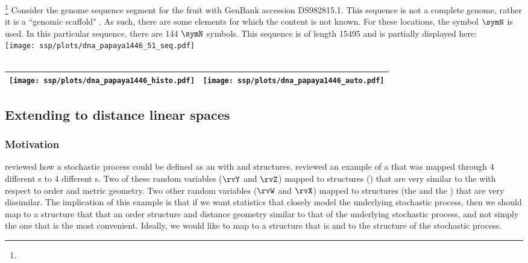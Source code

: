 \begin{example}
\footnote{
  }
\label{ex:dna_papaya}
Consider the genome sequence segment for the fruit
 with GenBank accession DS982815.1.
This sequence is not a complete genome, rather it is a ``genomic scaffold" . 
As such, there are some elements for which the content is not known.
For these locations, the symbol $\symN$ is used.
In this particular sequence, there are 144 $\symN$ symbols.
This sequence is of length 15495 and is partially displayed here:
  \\\texttt{[image: ssp/plots/dna\_papaya1446\_51\_seq.pdf]}\\
     \\\begin{tabular}{|>{\scs}c|>{\scs}c|}
          \hline
          \texttt{[image: ssp/plots/dna\_papaya1446\_histo.pdf]}%
         &\texttt{[image: ssp/plots/dna\_papaya1446\_auto.pdf]}
        \\\hline
     \end{tabular}
\end{example}

\subsection{Extending to distance linear spaces}
\subsubsection{Motivation}
 reviewed how a stochastic process could be defined as an 
with  and  structures.
 reviewed an example of a  
that was mapped through 4 different s to 4 different s.
Two of these random variables ($\rvY$ and $\rvZ$) mapped to structures () that are very similar 
to the  with respect to order and metric geometry.
Two other random variables ($\rvW$ and $\rvX$) mapped to structures 
(the  and the ) that are very dissimilar.
The implication of this example is that if we want statistics that closely model the underlying stochastic process,
then we should map to a structure that that an order structure and distance geometry similar to 
that of the underlying stochastic process, and not simply the one that is the most convenient.
Ideally, we would like to map to a structure that is  
and   to the structure of the stochastic process.

